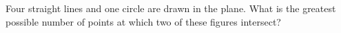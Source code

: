 Four straight lines and one circle are drawn in the plane. What is the greatest possible number of points at which two of these figures intersect?
